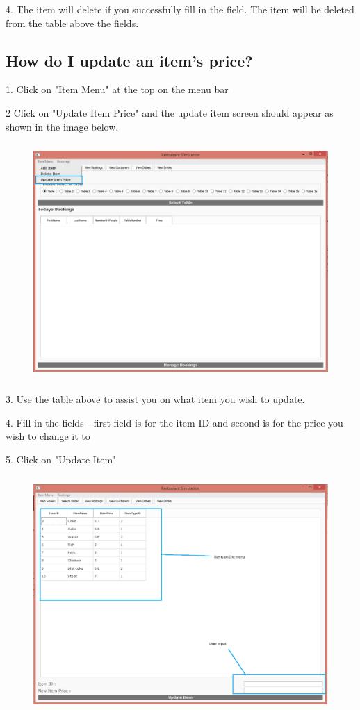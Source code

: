 4. The item will delete if you successfully fill in the field. The item will be deleted from the table above the fields.

\subsection{How do I update an item's price?}
1. Click on "Item Menu" at the top on the menu bar

2 Click on "Update Item Price" and the  update item screen should appear as shown in the image below.
\begin{figure}[H]
    \includegraphics[height = 9cm]{./Manual/images/UpdateItem1} 
    \caption{} \label{fig:updateitem1}
\end{figure}

3. Use the table above to assist you on what item you wish to update.

4. Fill in the fields - first field is for the item ID and second is for the price you wish to change it to

5. Click on "Update Item"
\begin{figure}[H]
    \includegraphics[height = 9cm]{./Manual/images/UpdateItem2} 
    \caption{} \label{fig:updateitem2}
\end{figure}

